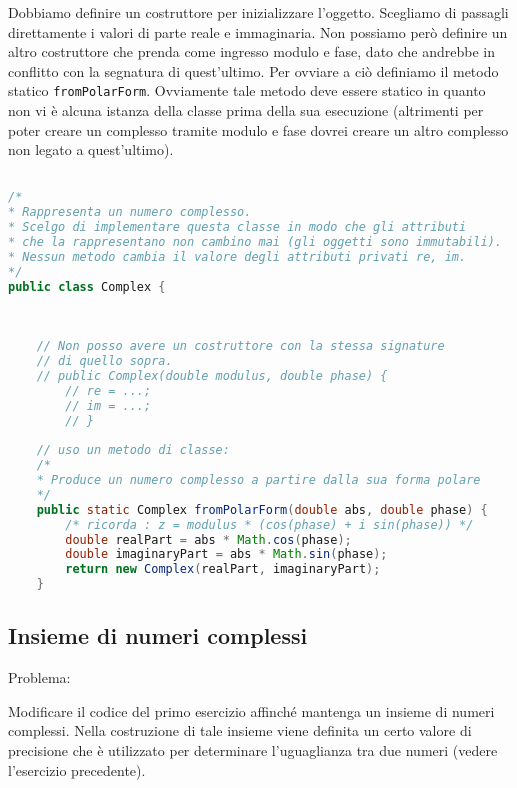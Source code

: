\documentclass{article}
\begin{document}
Dobbiamo definire un costruttore per inizializzare l'oggetto.
Scegliamo di passagli direttamente i valori di parte reale e immaginaria.
Non possiamo per\`o definire un altro costruttore che prenda come ingresso
modulo e fase, dato che andrebbe in conflitto con la segnatura di quest'ultimo.
Per ovviare a ciò definiamo il metodo statico \texttt{fromPolarForm}.
Ovviamente tale metodo deve essere statico in quanto non vi è
alcuna istanza della classe prima della sua esecuzione (altrimenti
per poter creare un complesso tramite modulo e fase dovrei creare un altro complesso
non legato a quest'ultimo).
\begin{lstlisting}[language=Java,escapechar=|]

/*
* Rappresenta un numero complesso.
* Scelgo di implementare questa classe in modo che gli attributi
* che la rappresentano non cambino mai (gli oggetti sono immutabili).
* Nessun metodo cambia il valore degli attributi privati re, im.
*/
public class Complex {
	
	
	
	// Non posso avere un costruttore con la stessa signature
	// di quello sopra.
	// public Complex(double modulus, double phase) {
		// re = ...;
		// im = ...;
		// }
	
	// uso un metodo di classe:
	/*
	* Produce un numero complesso a partire dalla sua forma polare
	*/
	public static Complex fromPolarForm(double abs, double phase) {
		/* ricorda : z = modulus * (cos(phase) + i sin(phase)) */
		double realPart = abs * Math.cos(phase);
		double imaginaryPart = abs * Math.sin(phase);
		return new Complex(realPart, imaginaryPart);
	}
\end{lstlisting}

\subsection{Insieme di numeri complessi}

Problema:

Modificare il codice del primo esercizio affinché mantenga un insieme
di numeri complessi.
Nella costruzione di tale insieme viene definita un certo valore di precisione
che è utilizzato per determinare l'uguaglianza tra due numeri (vedere l'esercizio precedente).
\end{document}
